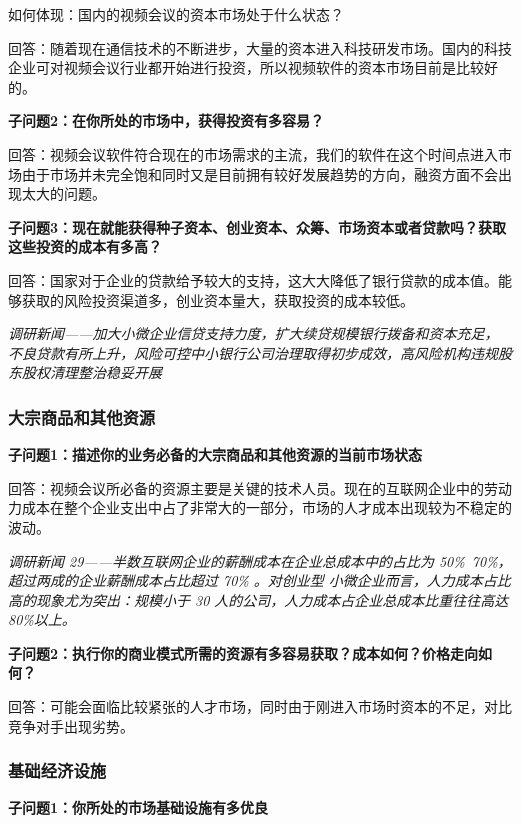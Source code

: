 \documentclass[a4paper,12pt]{article}
\begin{document}
    如何体现：国内的视频会议的资本市场处于什么状态？

    回答：随着现在通信技术的不断进步，⼤量的资本进⼊科技研发市场。国内的科技企业可对视频会议⾏业都开始进⾏投资，所以视频软件的资本市场⽬前是⽐较好的。
    
    \textbf{子问题2：在你所处的市场中，获得投资有多容易？}

    回答：视频会议软件符合现在的市场需求的主流，我们的软件在这个时间点进⼊市场由于市场并未完全饱和同时⼜是⽬前拥有较好发展趋势的⽅向，融资⽅⾯不会出现太⼤的问题。

    \textbf{子问题3：现在就能获得种子资本、创业资本、众筹、市场资本或者贷款吗？获取这些投资的成本有多高？}

    回答：国家对于企业的贷款给予较⼤的⽀持，这⼤⼤降低了银⾏贷款的成本值。能够获取的⻛险投资渠道多，创业资本量⼤，获取投资的成本较低。

    \textit{调研新闻——加⼤⼩微企业信贷⽀持⼒度，扩⼤续贷规模银⾏拨备和资本充⾜，不良贷款有所上升，风险可控中⼩银⾏公司治理取得初步成效，⾼⻛险机构违规股东股权清理整治稳妥开展}

    \textit{}

    \subsubsection{大宗商品和其他资源}
    \textbf{子问题1：描述你的业务必备的大宗商品和其他资源的当前市场状态}

    回答：视频会议所必备的资源主要是关键的技术⼈员。现在的互联⽹企业中的劳动⼒成本在整个企业⽀出中占了⾮常⼤的⼀部分，市场的⼈才成本出现较为不稳定的波动。

    \textit{调研新闻 29——半数互联⽹企业的薪酬成本在企业总成本中的占⽐为 50\%~70\%，超过两成的企业薪酬成本占⽐超过 70\% 。对创业型 ⼩微企业⽽⾔，⼈⼒成本占⽐⾼的现象尤为突出：规模⼩于 30 ⼈的公司，⼈⼒成本占企业总成本⽐重往往⾼达 80\%以上。}

    \textit{}

    \textbf{子问题2：执行你的商业模式所需的资源有多容易获取？成本如何？价格走向如何？}

    回答：可能会⾯临⽐较紧张的⼈才市场，同时由于刚进⼊市场时资本的不⾜，对⽐竞争对⼿出现劣势。

    \subsubsection{基础经济设施}
    \textbf{子问题1：你所处的市场基础设施有多优良}
\end{document}
